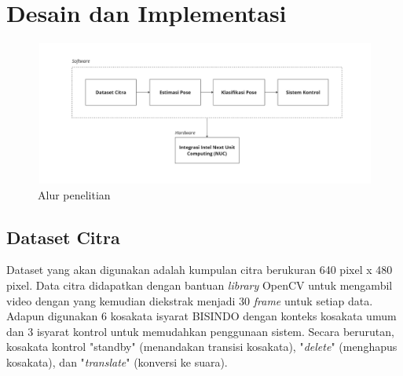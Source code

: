 \section{Desain dan Implementasi}
\label{sec:desaindanimplementasi}

\begin{figure}[ht]
  \centering

  \includegraphics[scale=0.095]{gambar/bab3-block-diagram-nuc.jpg}

  \caption{Alur penelitian}
  \label{fig:blockdiagrammethod}
\end{figure}

\subsection{Dataset Citra}
\label{subsec:datasetcitra}

Dataset yang akan digunakan adalah kumpulan citra berukuran 640 pixel x 480 pixel. Data citra didapatkan dengan bantuan \emph{library} OpenCV untuk mengambil video dengan yang kemudian diekstrak menjadi 30 \emph{frame} untuk setiap data. Adapun digunakan 6 kosakata isyarat BISINDO dengan konteks kosakata umum dan 3 isyarat kontrol untuk memudahkan penggunaan sistem. Secara berurutan, kosakata kontrol "standby" (menandakan transisi kosakata), "\emph{delete}" (menghapus kosakata), dan "\emph{translate}" (konversi ke suara).

